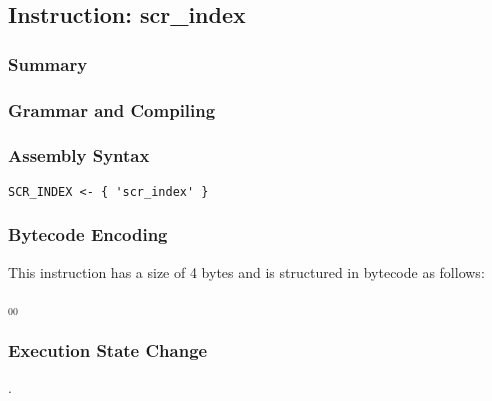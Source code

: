 \subsection{Instruction: scr\_index}

\subsubsection{Summary}


\subsubsection{Grammar and Compiling}


\subsubsection{Assembly Syntax}

\begin{myquote}
\begin{verbatim}
SCR_INDEX <- { 'scr_index' }
\end{verbatim}
\end{myquote}

\subsubsection{Bytecode Encoding}

This instruction has a size of 4 bytes and is structured in bytecode as follows:

$_{00}$\ 

\subsubsection{Execution State Change}

.



